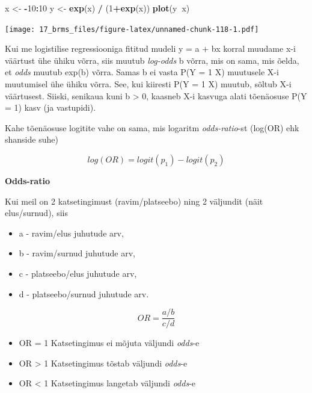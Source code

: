\documentclass[]{book}
\newenvironment{Shaded}{\begin{snugshade}}{\end{snugshade}}
\newcommand{\KeywordTok}[1]{\textcolor[rgb]{0.13,0.29,0.53}{\textbf{#1}}}
\newcommand{\DecValTok}[1]{\textcolor[rgb]{0.00,0.00,0.81}{#1}}
\newcommand{\StringTok}[1]{\textcolor[rgb]{0.31,0.60,0.02}{#1}}
\newcommand{\OperatorTok}[1]{\textcolor[rgb]{0.81,0.36,0.00}{\textbf{#1}}}
\newcommand{\NormalTok}[1]{#1}
\begin{document}
\begin{Shaded}
\begin{Highlighting}[]
\NormalTok{x <-}\StringTok{ }\OperatorTok{-}\DecValTok{10}\OperatorTok{:}\DecValTok{10}
\NormalTok{y <-}\StringTok{ }\KeywordTok{exp}\NormalTok{(x) }\OperatorTok{/}\StringTok{ }\NormalTok{(}\DecValTok{1}\OperatorTok{+}\KeywordTok{exp}\NormalTok{(x))}
\KeywordTok{plot}\NormalTok{(y}\OperatorTok{~}\NormalTok{x)}
\end{Highlighting}
\end{Shaded}

\texttt{[image: 17\_brms\_files/figure-latex/unnamed-chunk-118-1.pdf]}

Kui me logistilise regressiooniga fititud mudeli y = a + bx korral
muudame x-i väärtust ühe ühiku võrra, siis muutub \emph{log-odds} b
võrra, mis on sama, mis õelda, et \emph{odds} muutub exp(b) võrra. Samas
b ei vasta P(Y = 1 \textbar{} X) muutusele X-i muutumisel ühe ühiku
võrra. See, kui kiiresti P(Y = 1 \textbar{} X) muutub, sõltub X-i
väärtusest. Siiski, senikaua kuni b \textgreater{} 0, kaasneb X-i
kasvuga alati tõenäosuse P(Y = 1) kasv (ja vastupidi).

Kahe tõenäosuse logitite vahe on sama, mis logaritm \emph{odds-ratio}-st
(log(OR) ehk shanside suhe)

\[{log} (OR)= {logit} (p_{1})- {logit} (p_{2})\]

\textbf{Odds-ratio}

Kui meil on 2 katsetingimust (ravim/platseebo) ning 2 väljundit (näit
elus/surnud), siis

\begin{itemize}
\item
  a - ravim/elus juhutude arv,
\item
  b - ravim/surnud juhutude arv,
\item
  c - platseebo/elus juhutude arv,
\item
  d - platseebo/surnud juhutude arv.
\end{itemize}

\[OR = \frac {a/b}{c/d}\]

\begin{itemize}
\item
  OR = 1 Katsetingimus ei mõjuta väljundi \emph{odds}-e
\item
  OR \textgreater{} 1 Katsetingimus tõstab väljundi \emph{odds}-e
\item
  OR \textless{} 1 Katsetingimus langetab väljundi \emph{odds}-e
\end{itemize}
\end{document}
